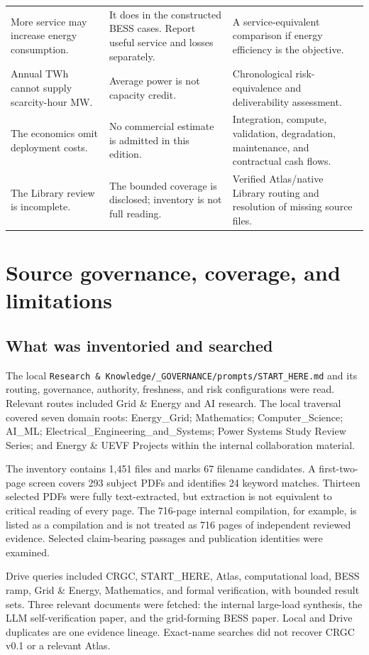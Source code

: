 \documentclass[11pt,letterpaper]{article}
\begin{document}
\begin{longtable}{P{.27\linewidth}P{.38\linewidth}P{.26\linewidth}}
More service may increase energy consumption. & It does in the constructed BESS cases. Report useful service and losses separately. & A service-equivalent comparison if energy efficiency is the objective.\\
Annual TWh cannot supply scarcity-hour MW. & Average power is not capacity credit. & Chronological risk-equivalence and deliverability assessment.\\
The economics omit deployment costs. & No commercial estimate is admitted in this edition. & Integration, compute, validation, degradation, maintenance, and contractual cash flows.\\
The Library review is incomplete. & The bounded coverage is disclosed; inventory is not full reading. & Verified Atlas/native Library routing and resolution of missing source files.\\
\bottomrule
\end{longtable}

\section{Source governance, coverage, and limitations}
\label{sec:sources}
\subsection{What was inventoried and searched}
The local \texttt{Research \& Knowledge/\_GOVERNANCE/prompts/START\_HERE.md} and its routing, governance, authority, freshness, and risk configurations were read. Relevant routes included Grid \& Energy and AI research. The local traversal covered seven domain roots: Energy\_Grid; Mathematics; Computer\_Science; AI\_ML; Electrical\_Engineering\_and\_Systems; Power Systems Study Review Series; and Energy \& UEVF Projects within the internal collaboration material.

The inventory contains 1,451 files and marks 67 filename candidates. A first-two-page screen covers 293 subject PDFs and identifies 24 keyword matches. Thirteen selected PDFs were fully text-extracted, but extraction is not equivalent to critical reading of every page. The 716-page internal compilation, for example, is listed as a compilation and is not treated as 716 pages of independent reviewed evidence. Selected claim-bearing passages and publication identities were examined.

Drive queries included CRGC, START\_HERE, Atlas, computational load, BESS ramp, Grid \& Energy, Mathematics, and formal verification, with bounded result sets. Three relevant documents were fetched: the internal large-load synthesis, the LLM self-verification paper, and the grid-forming BESS paper. Local and Drive duplicates are one evidence lineage. Exact-name searches did not recover CRGC v0.1 or a relevant Atlas.
\end{document}
